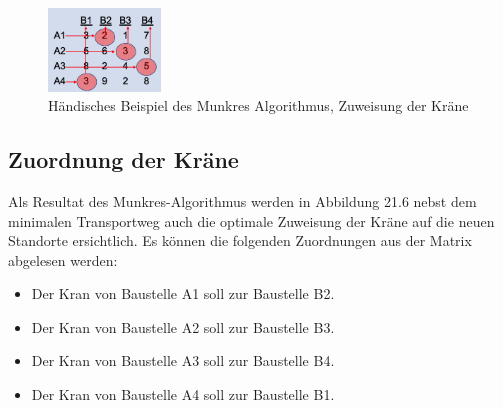 \begin{figure}
\centering
\includegraphics[width=3cm]{papers/munkres/figures/Ungarische_Methode_Beispiel_Zuw.png}
\caption{Händisches Beispiel des Munkres Algorithmus, Zuweisung der Kräne }
\label{munkres:Vr2}
\end{figure} 

\subsection{Zuordnung der Kräne
\label{munkres:subsection:malorum}}

Als Resultat des Munkres-Algorithmus werden in Abbildung 21.6 nebst dem minimalen Transportweg auch die optimale Zuweisung der Kräne auf die neuen Standorte ersichtlich.
Es können die folgenden Zuordnungen aus der Matrix abgelesen werden:
\begin{itemize}
\item Der Kran von Baustelle A1 soll zur Baustelle B2.
\item Der Kran von Baustelle A2 soll zur Baustelle B3.
\item Der Kran von Baustelle A3 soll zur Baustelle B4.
\item Der Kran von Baustelle A4 soll zur Baustelle B1.
\end{itemize}


